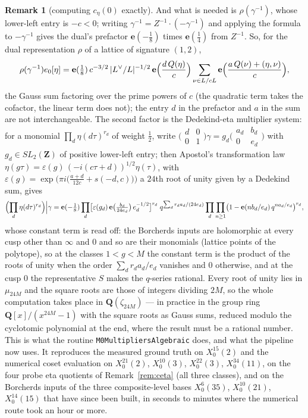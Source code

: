 \documentclass[11pt,reqno]{amsart}
\theoremstyle{plain}
\theoremstyle{definition}
\newtheorem{remark}[theorem]{Remark}
\newcommand{\Ldual}{L^{\vee}}
\begin{document}
\begin{remark}[computing $c_\eta(0)$ exactly]
And what is needed is $\rho(\gamma^{-1})$, whose lower-left entry is $-c<0$; writing
$\gamma^{-1}=Z^{-1}\cdot(-\gamma^{-1})$ and applying the formula to $-\gamma^{-1}$ gives the dual's
prefactor $\mathbf e(-\tfrac18)$ times $\mathbf e(\tfrac14)$ from $Z^{-1}$. So, for the dual
representation $\rho$ of a lattice of signature $(1,2)$,
\[
\rho(\gamma^{-1})e_0[\eta]=\mathbf e(\tfrac18)\,c^{-3/2}\,\lvert\Ldual/L\rvert^{-1/2}\,
\mathbf e\Bigl(\frac{d\,Q(\eta)}c\Bigr)\sum_{\nu\in L/cL}\mathbf e\Bigl(\frac{a\,Q(\nu)+(\eta,\nu)}c\Bigr),
\]
the Gauss sum factoring over the prime powers of $c$ (the quadratic term takes the cofactor, the
linear term does not); the entry $d$ in the prefactor and $a$ in the sum are not interchangeable.
The second factor is the Dedekind-eta multiplier system: for a monomial $\prod_d\eta(d\tau)^{r_d}$
of weight $\tfrac12$, write $\bigl(\begin{smallmatrix}d&0\\0&1\end{smallmatrix}\bigr)\gamma=g_d
\bigl(\begin{smallmatrix}a_d&b_d\\0&e_d\end{smallmatrix}\bigr)$ with $g_d\in SL_2(\mathbf Z)$ of
positive lower-left entry; then Apostol's transformation law $\eta(g\tau)=\varepsilon(g)\,
(-i(c\tau+d))^{1/2}\eta(\tau)$, with $\varepsilon(g)=\exp\bigl(\pi i\bigl(\frac{a+d}{12c}+s(-d,c)
\bigr)\bigr)$ a $24$th root of unity given by a Dedekind sum, gives
\[
\Bigl(\prod_d\eta(d\tau)^{r_d}\Bigr)\Big|\gamma
=\mathbf e(-\tfrac18)\prod_d\bigl[\varepsilon(g_d)\,\mathbf e\bigl(\tfrac{b_d}{24e_d}\bigr)\,
e_d^{-1/2}\bigr]^{r_d}\;q^{\sum_d r_da_d/(24e_d)}\prod_d\prod_{n\ge1}
\bigl(1-\mathbf e(nb_d/e_d)\,q^{na_d/e_d}\bigr)^{r_d},
\]
whose constant term is read off: the Borcherds inputs are holomorphic at every cusp other than
$\infty$ and $0$ and so are their monomials (lattice points of the polytope), so at the classes
$1<g<M$ the constant term is the product of the roots of unity when the order $\sum_dr_da_d/e_d$
vanishes and $0$ otherwise, and at the cusp $0$ the representative $S$ makes the $q$-series rational.
Every root of unity lies in $\mu_{24M}$ and the square roots are those of integers dividing $2M$, so
the whole computation takes place in $\mathbf Q(\zeta_{24M})$ --- in practice in the group ring
$\mathbf Q[x]/(x^{24M}-1)$ with the square roots as Gauss sums, reduced modulo the cyclotomic
polynomial at the end, where the result must be a rational number. This is what the routine
\texttt{M0MultipliersAlgebraic} does, and what the pipeline now uses. It reproduces the measured
ground truth on $X_0^{15}(2)$ and the numerical coset evaluation on $X_0^{21}(2)$, $X_0^{10}(3)$,
$X_0^{22}(3)$, $X_0^{34}(11)$, on the four probe eta quotients of Remark~\ref{rem:ceta}
(all three classes), and on the Borcherds inputs of the three composite-level bases $X_0^6(35)$,
$X_0^{10}(21)$, $X_0^{14}(15)$ that have since been built, in seconds to minutes where the numerical
route took an hour or more.
\end{remark}
\end{document}
